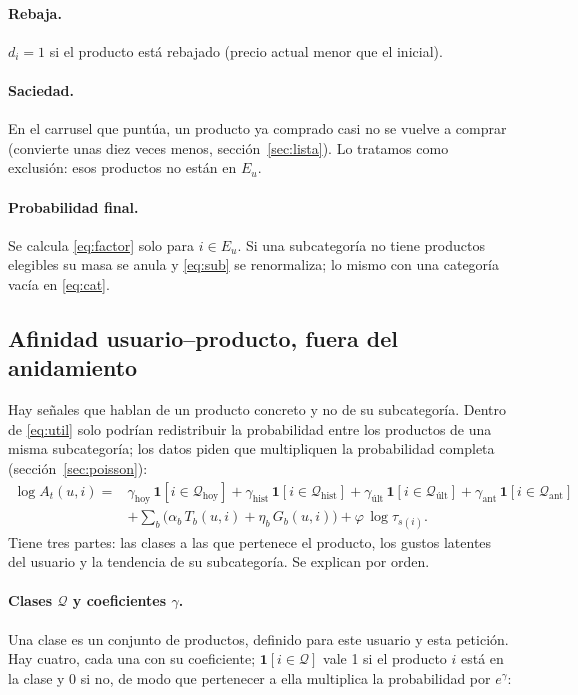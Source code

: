 \documentclass[11pt,a4paper]{article}
\begin{document}
\paragraph{Rebaja.} $d_i=1$ si el producto está rebajado (precio actual menor que el inicial).

\paragraph{Saciedad.} En el carrusel que puntúa, un producto ya comprado casi no se vuelve a comprar
(convierte unas diez veces menos, sección~\ref{sec:lista}). Lo tratamos como exclusión: esos productos
no están en $E_u$.

\paragraph{Probabilidad final.} Se calcula \eqref{eq:factor} solo para $i\in E_u$. Si una subcategoría
no tiene productos elegibles su masa se anula y \eqref{eq:sub} se renormaliza; lo mismo con una
categoría vacía en \eqref{eq:cat}.

\subsection{Afinidad usuario--producto, fuera del anidamiento}\label{sec:afinidad}

Hay señales que hablan de un producto concreto y no de su subcategoría. Dentro de \eqref{eq:util} solo
podrían redistribuir la probabilidad entre los productos de una misma subcategoría; los datos piden que
multipliquen la probabilidad completa (sección~\ref{sec:poisson}):
\begin{equation}
\begin{aligned}
\log A_t(u,i)={}&\gamma_{\text{hoy}}\,\mathbf 1[i\in\mathcal Q_{\text{hoy}}]
+\gamma_{\text{hist}}\,\mathbf 1[i\in\mathcal Q_{\text{hist}}]
+\gamma_{\text{últ}}\,\mathbf 1[i\in\mathcal Q_{\text{últ}}]
+\gamma_{\text{ant}}\,\mathbf 1[i\in\mathcal Q_{\text{ant}}]\\
&+\sum_{b}\big(\alpha_b\,T_b(u,i)+\eta_b\,G_b(u,i)\big)+\varphi\,\log\tau_{s(i)} .
\end{aligned}\label{eq:afinidad}
\end{equation}
Tiene tres partes: las clases a las que pertenece el producto, los gustos latentes del usuario y la
tendencia de su subcategoría. Se explican por orden.

\paragraph{Clases $\mathcal Q$ y coeficientes $\gamma$.} Una clase es un conjunto de productos, definido
para este usuario y esta petición. Hay cuatro, cada una con su coeficiente; $\mathbf 1[i\in\mathcal Q]$
vale 1 si el producto $i$ está en la clase y 0 si no, de modo que pertenecer a ella multiplica la
probabilidad por $e^{\gamma}$:
\end{document}
